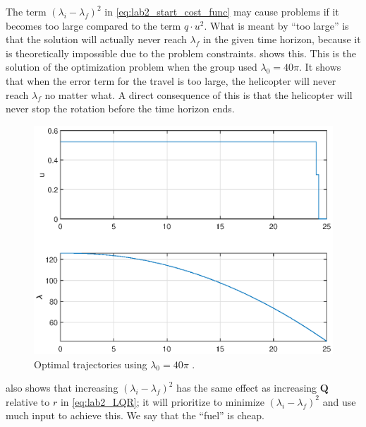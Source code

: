 \documentclass[../main.tex]{subfiles}
\begin{document}
The term $(\lambda_i-\lambda_f )^2$ in \cref{eq:lab2_start_cost_func} may cause problems if it becomes too large compared to the term $ q \cdot u^2 $. What is meant by ``too large'' is that the solution will actually never reach $ \lambda_f $ in the given time horizon, because it is theoretically impossible due to the problem constraints.  shows this. This is the solution of the optimization problem when the group used $ \lambda_0 = 40\pi $. It shows that when the error term for the travel is too large, the helicopter will never reach $ \lambda_f $ no matter what. A direct consequence of this is that the helicopter will never stop the rotation before the time horizon ends.
\begin{figure}[h]
	\centering
	\includegraphics[width=\linewidth]{figures/lab2_1_5_example.eps}
	\caption{Optimal trajectories using $\lambda_0 = 40\pi$ .}
	\label{fig:lab2_too_large}
\end{figure}
 also shows that increasing $(\lambda_i-\lambda_f )^2$ has the same effect as increasing $ \bm Q $ relative to $ r $ in \cref{eq:lab2_LQR}; it will prioritize to minimize $(\lambda_i-\lambda_f )^2$ and use much input to achieve this. We say that the ``fuel'' is cheap.
\end{document}
